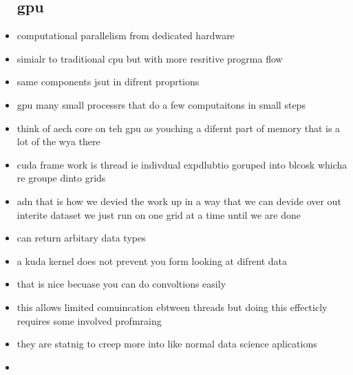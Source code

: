 \documentclass{article}
\begin{document}
\begin{itemize}
\subsection*{gpu }
\item computational parallelism from dedicated hardware 
\item simialr to traditional cpu but with more resritive progrma flow 
\item same components jsut in difrent proprtions 
\item gpu many small processrs that do a few computaitons in small steps 
\item think of aech core on teh gpu as youching a difernt part of memory that is a lot of the wya there 
\item cuda frame work is thread ie indivdual expdlubtio goruped into blcosk whicha re groupe dinto grids 
\item adn that is how we devied the work up in a way that we can devide over out interite dataset we just run on one grid at a time until we are done 
\item can return arbitary data types 
\item a kuda kernel does not prevent you form looking at difrent data 
\item that is nice becuase you can do convoltions easily 
\item this allows limited comuincation ebtween threads but doing this effecticly requires some involved profmraing 
\item they are statnig to creep more into like normal data science aplications
\item 
\end{itemize}
\end{document}
